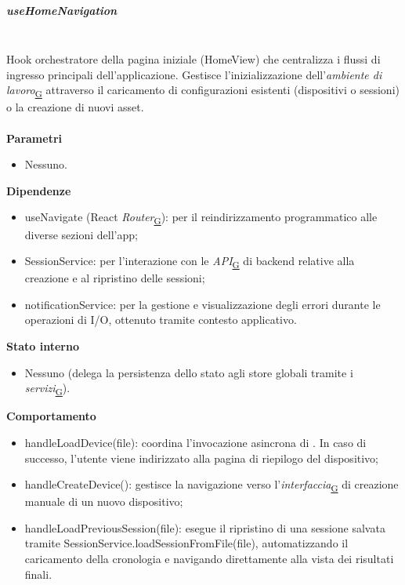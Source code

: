 \documentclass[a4paper,12pt]{article}
\begin{document}
                \subparagraph{useHomeNavigation}\mbox{}\\
                Hook orchestratore della pagina iniziale ({\ttfamily HomeView}) che centralizza i flussi di ingresso principali dell'applicazione. Gestisce l'inizializzazione dell'\textit{ambiente di lavoro}\textsubscript{\href{https://atlasteam9.github.io/Atlas/glossario.html\#Ambientedilavoro}{G}} attraverso il caricamento di configurazioni esistenti (dispositivi o sessioni) o la creazione di nuovi asset.\\\\
                \textbf{Parametri}
                \begin{itemize}
                    \item Nessuno.
                \end{itemize}
                \textbf{Dipendenze}
                \begin{itemize}
                    \item {\ttfamily useNavigate} (React \textit{Router}\textsubscript{\href{https://atlasteam9.github.io/Atlas/glossario.html\#Router}{G}}): per il reindirizzamento programmatico alle diverse sezioni dell'app;
                    \item {\ttfamily SessionService}: per l'interazione con le \textit{API}\textsubscript{\href{https://atlasteam9.github.io/Atlas/glossario.html\#API}{G}} di backend relative alla creazione e al ripristino delle sessioni;
                    \item {\ttfamily notificationService}: per la gestione e visualizzazione degli errori durante le operazioni di I/O, ottenuto tramite contesto applicativo.
                \end{itemize}
                \textbf{Stato interno}
                \begin{itemize}
                    \item Nessuno (delega la persistenza dello stato agli store globali tramite i \textit{servizi}\textsubscript{\href{https://atlasteam9.github.io/Atlas/glossario.html\#Servizi}{G}}).
                \end{itemize}
                \textbf{Comportamento}
                \begin{itemize}
                    \item {\ttfamily handleLoadDevice(file)}: coordina l'invocazione asincrona di . In caso di successo, l'utente viene indirizzato alla pagina di riepilogo del dispositivo;
                    \item {\ttfamily handleCreateDevice()}: gestisce la navigazione verso l'\textit{interfaccia}\textsubscript{\href{https://atlasteam9.github.io/Atlas/glossario.html\#Interfaccia}{G}} di creazione manuale di un nuovo dispositivo;
                    \item {\ttfamily handleLoadPreviousSession(file)}: esegue il ripristino di una sessione salvata tramite {\ttfamily SessionService.loadSessionFromFile(file)}, automatizzando il caricamento della cronologia e navigando direttamente alla vista dei risultati finali.
                \end{itemize}
\end{document}
